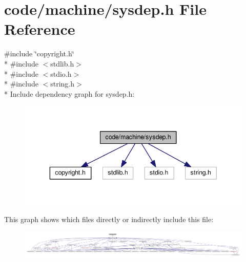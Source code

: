 \section{code/machine/sysdep.h File Reference}
\label{sysdep_8h}
{\ttfamily \#include \char`\"{}copyright.\+h\char`\"{}}\\*
{\ttfamily \#include $<$stdlib.\+h$>$}\\*
{\ttfamily \#include $<$stdio.\+h$>$}\\*
{\ttfamily \#include $<$string.\+h$>$}\\*
Include dependency graph for sysdep.\+h\+:
\nopagebreak
\begin{figure}[H]
\begin{center}
\leavevmode
\includegraphics[width=343pt]{sysdep_8h__incl}
\end{center}
\end{figure}
This graph shows which files directly or indirectly include this file\+:
\nopagebreak
\begin{figure}[H]
\begin{center}
\leavevmode
\includegraphics[width=350pt]{sysdep_8h__dep__incl}
\end{center}
\end{figure}
